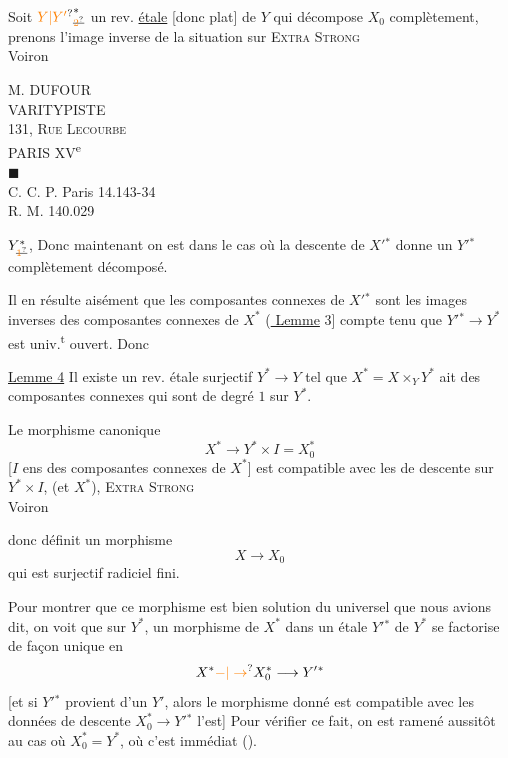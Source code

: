 Soit ${\unsure{Y|Y'}}^{*}_{\deleted{\unsure{2}}}$ un rev. \uline{étale} [donc plat] de $Y$ qui décompose $X_0$ complètement, prenons l'image inverse de la situation sur
\textsc{Extra Strong}\\
 Voiron

M. DUFOUR\\
VARITYPISTE\\
131, \textsc{Rue Lecourbe}\\
PARIS XV\textsuperscript{e}\\
$\blacksquare$\\
C. C. P. Paris 14.143-34\\
R. M. 140.029

$Y^{*}_{\deleted{\unsure{1}}}$, Donc maintenant on est dans le cas où la descente de $X'{}^{*}$ donne un $Y'{}^{*}$ complètement décomposé.

Il en résulte aisément que les composantes connexes de $X'{}^{*}$ sont les images inverses des composantes connexes de $X^{*}$ (\uline{ Lemme} 3] compte tenu que  $Y'{}^{*}\to Y^{*}$ est univ.\textsuperscript{t} ouvert. Donc

\uline{Lemme 4} Il existe un rev. étale surjectif $Y^{*}\longrightarrow Y$ tel que $X^{*}=X\times_Y Y^{*}$ ait des composantes connexes qui sont de degré $1$ sur $Y^{*}$.

Le morphisme canonique
\[
X^{*}\longrightarrow Y^{*}\times I=X^{*}_0
\]
[$I$ ens des composantes connexes de $X^{*}$] est compatible   avec les  de descente sur $Y^{*}\times I$, (et $X^{*}$), \unsure{\textbackslash}
\textsc{Extra Strong}\\
 Voiron

donc définit un morphisme 
\[
X\longrightarrow X_0
\]
qui est surjectif radiciel fini.

Pour montrer que ce morphisme est bien solution du  universel que nous avions dit, on voit que sur $Y^{*}$, un morphisme de $X^{*}$ dans un  étale $Y'{}^{*}$ de $Y^{*}$ se factorise de façon unique en
\[
X^{*}\unsure{-|\to} X_0^{*}\longrightarrow Y'{}^{*}
\]
[et si $Y'{}^{*}$ provient d'un $Y'$, alors le morphisme donné est compatible avec les données de descente  $X^{*}_0\to Y'{}^{*}$ l'est] Pour vérifier ce fait, on est ramené aussitôt au cas où $X^{*}_0=Y^{*}$, où c'est immédiat \unsure{---} ().

